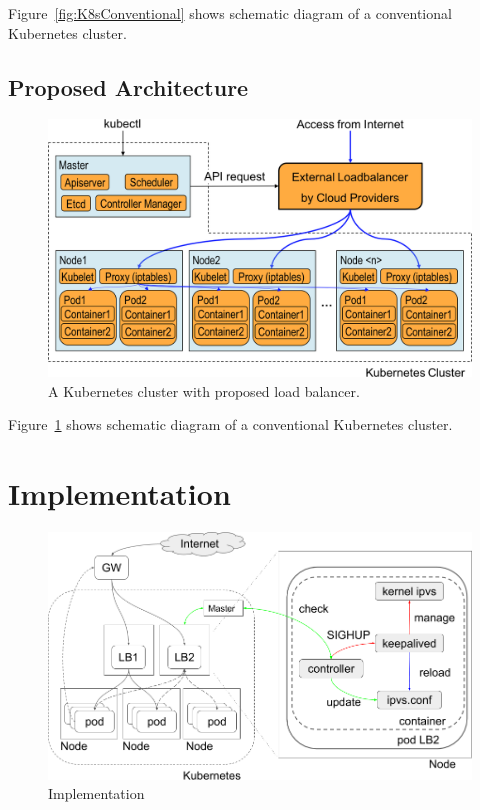 Figure~\ref{fig:K8sConventional} shows schematic diagram of a conventional Kubernetes cluster.


\subsection{Proposed Architecture}

\begin{figure}
\includegraphics[width=\columnwidth]{Figs/K8sConventional}
\caption{A Kubernetes cluster with proposed load balancer.}
\label{fig:K8sProposed}
\end{figure}

Figure~\ref{fig:K8sProposed} shows schematic diagram of a conventional Kubernetes cluster.

\section{Implementation}

\begin{figure}
\includegraphics[width=\columnwidth]{Figs/ipvs-ingress-schem}
\caption{Implementation}
\label{fig:ipvs-ingress-schem}
\end{figure}

